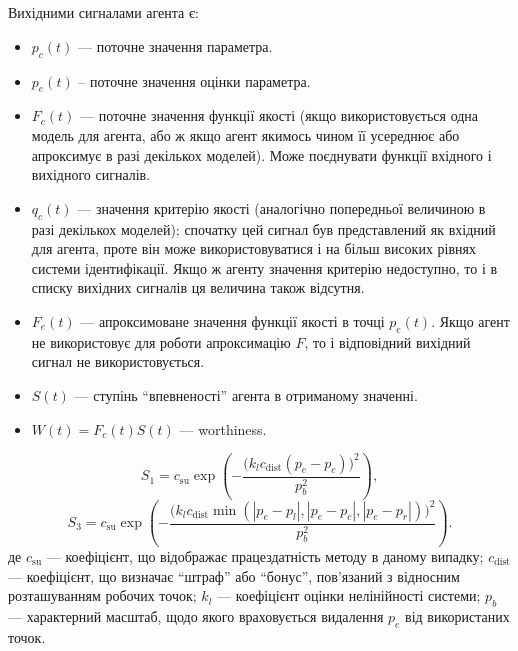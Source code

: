 \documentclass[14pt,handout,utf8]{beamer}
\newcommand{\Xhead}[1]{
 \begin{center}%
      \textbf{#1}%
 \end{center}%
}
\begin{document}
\begin{frame}
  \frametitle{~}

  \Xhead{}

  Вихідними сигналами агента є:

  \begin{itemize}

    \item
      $p_c(t)$ ---
      поточне значення параметра.

    \item
      $p_e(t)$\label{atu:d:p_e} --
      поточне значення оцінки параметра.

    \item
      $F_c(t)$ ---
      поточне значення функції якості (якщо використовується одна
      модель для агента, або ж якщо агент якимось чином її усереднює
      або апроксимує в разі декількох моделей). Може поєднувати
      функції вхідного і вихідного сигналів.

    \item
      $q_c(t)$ ---
      значення критерію якості (аналогічно попередньої величиною в
      разі декількох моделей); спочатку цей сигнал був представлений
      як вхідний для агента, проте він може використовуватися і
      на більш високих рівнях системи ідентифікації. Якщо ж агенту
      значення критерію недоступно, то і в списку вихідних сигналів
      ця величина також відсутня.

    \item
      $F_e(t)$ ---
      апроксимоване значення функції якості в точці
      $p_e(t)$. Якщо агент не використовує для роботи апроксимацію
      $F$, то і відповідний вихідний сигнал не використовується.

    \item
      $S(t)$ ---
      ступінь ``впевненості'' агента в отриманому значенні.

    \item
   $W(t) = F_c(t) S(t)$ --- worthiness.
  \end{itemize}

%
\begin{equation}
  S_1 = c_\mathrm{su} \exp \left( - \frac{ \big( k_l c_\mathrm{dist} ( p_e - p_c ) \big)^2 }{p_b^2} \right)
  ,
  \label{atu:eq:S1}
\end{equation}
%
\begin{equation}
  S_3 = c_\mathrm{su} \exp \left( - \frac{ \big( k_l c_\mathrm{dist} \min( |p_e - p_l|,|p_e - p_c|, |p_e - p_r| ) \big)^2 }{p_b^2} \right)
  .
  \label{atu:eq:S3}
\end{equation}
%
де
$c_\mathrm{su}$ ---
коефіцієнт, що відображає працездатність методу в даному випадку;
$c_\mathrm{dist}$ ---
коефіцієнт, що визначає ``штраф'' або ``бонус'', пов'язаний з відносним розташуванням робочих точок;
$k_l$ ---
коефіцієнт оцінки нелінійності системи;
$p_b$
--- характерний масштаб, щодо якого враховується видалення $p_e$ від використаних точок.

\end{frame}
\end{document}
